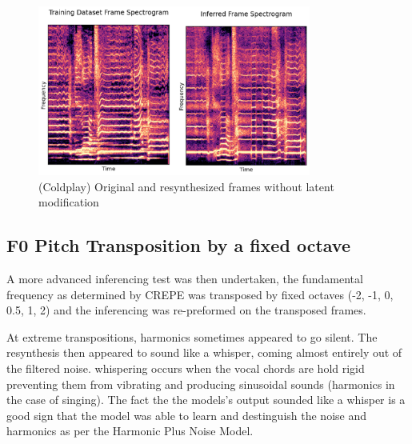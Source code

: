 \begin{figure}[!ht]
    \centering
    \includegraphics[width=0.8\textwidth]{research/results/Coldplay/InferredRecreation.png}
    \caption{(Coldplay) Original and resynthesized frames without latent modification}
\end{figure}

\subsection{F0 Pitch Transposition by a fixed octave}

A more advanced inferencing test was then undertaken, the fundamental frequency as determined by CREPE was transposed by fixed octaves (-2, -1, 0, 0.5, 1, 2) and the inferencing was re-preformed on the transposed frames.

At extreme transpositions, harmonics sometimes appeared to go silent. The resynthesis then appeared to sound like a whisper, coming almost entirely out of the filtered noise. whispering occurs when the vocal chords are hold rigid preventing them from vibrating and producing sinusoidal sounds (harmonics in the case of singing). The fact the the models's output sounded like a whisper is a good sign that the model was able to learn and destinguish the noise and harmonics as per the Harmonic Plus Noise Model\cite{HarmonicPlusNoise}\cite{OriginalDDSP}.

